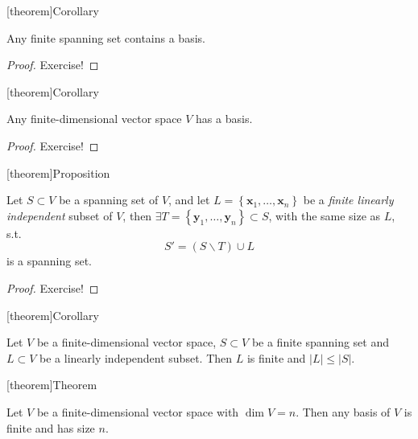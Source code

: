 \documentclass[12pt]{report}
\theoremstyle{definition}
\begin{document}
[theorem]{Corollary}
\begin{any finite spanning set contains a basis}
    Any finite spanning set contains a basis.
\end{any finite spanning set contains a basis}

\begin{proof}
    Exercise!
\end{proof}

[theorem]{Corollary}
\begin{any finite-dimensional v has a basis}
Any finite-dimensional vector space $V$ has a basis.
\end{any finite-dimensional v has a basis}

\begin{proof}
    Exercise!
\end{proof}

[theorem]{Proposition}
\begin{Steinitz exchange lemma}
Let $S \subset V$ be a spanning set of $V$, and let $L = \left\{\mathbf{x}_1, \ldots, \mathbf{x}_n\right\} $
be a \emph{finite linearly independent} subset of $V$, then 
$\exists T = \left\{\mathbf{y}_1,\ldots,\mathbf{y}_n\right\} \subset S$, with the same size as $L$, s.t.\[
    S' = (S\backslash T)\cup L
\]is a spanning set.
\end{Steinitz exchange lemma}

\begin{proof}
    Exercise!
\end{proof}

[theorem]{Corollary}
\begin{finite spanning set and linearly independent set}
    Let $V$ be a finite-dimensional vector space, $S \subset V$ be a finite spanning set
    and $L \subset V$ be a linearly independent subset.
    Then $L$ is finite and $|L| \le |S|$.
\end{finite spanning set and linearly independent set}

[theorem]{Theorem}
\begin{dimension and basis}
    Let $V$ be a finite-dimensional vector space with $\dim{V} = n$.
    Then any basis of $V$ is finite and has size $n$.
\end{dimension and basis}
\end{document}
